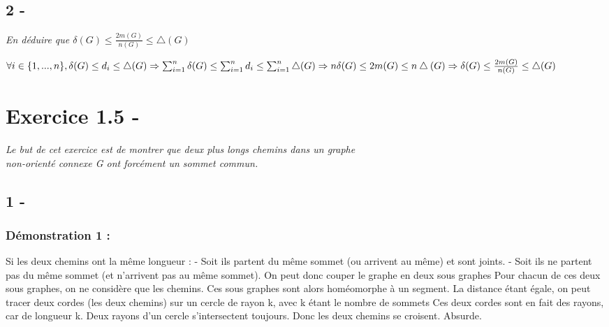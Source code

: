 \documentclass{article}
\begin{document}
    \subsection*{2 -}
            \textit{En déduire que $\delta(G) \leq \frac{2m(G)}{n(G)} \leq \bigtriangleup(G)$}\\
            \begin{center}
            $
            \forall i \in \{1,...,n\}, \delta(G) \leq d_{i} \leq \bigtriangleup(G)
            \linebreak
            \Rightarrow \sum_{i=1}^{n} \delta(G) \leq \sum_{i=1}^{n} d_{i} \leq \sum_{i=1}^{n} \bigtriangleup(G)
            \linebreak
            \Rightarrow n \delta(G) \leq 2m(G) \leq n\bigtriangleup(G)
            \linebreak
            \Rightarrow  \delta(G) \leq \frac{2m(G)}{n(G)} \leq \bigtriangleup(G)
            $
            \end{center}
\section*{Exercice 1.5 -}
\textit{Le but de cet exercice est de montrer que deux plus longs chemins dans un graphe\\ non-orienté connexe G ont forcément un sommet commun.}
    \subsection*{1 -}
            \subsubsection*{Démonstration 1 :}
            Si les deux chemins ont la même longueur :
            \linebreak
            - Soit ils partent du même sommet (ou arrivent au même) et sont joints.
            \linebreak
            - Soit ils ne partent pas du même sommet (et n'arrivent pas au même sommet).
            \linebreak
            On peut donc couper le graphe en deux sous graphes
            \linebreak
            Pour chacun de ces deux sous graphes, on ne considère que les chemins.
            \linebreak
            Ces sous graphes sont alors homéomorphe à un segment.
            \linebreak
            La distance étant égale, on peut tracer deux cordes
            \linebreak
            (les deux chemins) sur un cercle de rayon k, avec k étant le nombre de sommets
            \linebreak
            Ces deux cordes sont en fait des rayons, car de longueur k.
            \linebreak
            Deux rayons d'un cercle s'intersectent toujours.
            \linebreak
            Donc les deux chemins se croisent. Absurde.
\end{document}
